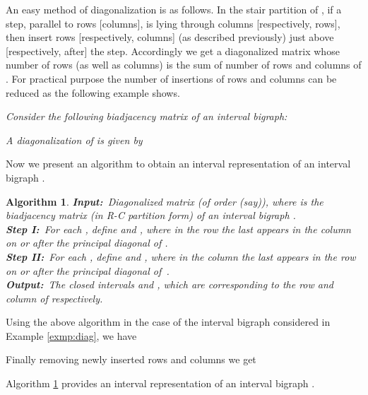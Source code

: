 \documentclass[secthm]{elsart}
\newtheorem{algo}[thm]{Algorithm}
\begin{document}
An easy method of diagonalization is as follows. In the stair partition of , if a step, parallel to rows [columns], is lying through  columns [respectively, rows], then insert  rows [respectively, columns] (as described previously) just above [respectively, after] the step. Accordingly we get a diagonalized matrix  whose number of rows (as well as columns) is the sum of number of rows and columns of . For practical purpose the number of insertions of rows and columns can be reduced as the following example shows.

\begin{exmp}\label{exmp:diag}
{\em Consider the following biadjacency matrix  of an interval bigraph:}

\vspace{-1.5em}

{\em A diagonalization of  is given by} 

\end{exmp}

\vspace{-1em}Now we present an algorithm to obtain an interval representation of an interval bigraph .

\begin{algo} \label{alg:big1}
{\em {\small\bf Input:}\ Diagonalized matrix  (of order  (say)), where  is the biadjacency matrix (in R-C partition form) of an interval bigraph .\\
{\small\bf Step I:}\ For each , define  and , where in the  row the last  appears in the  column on or after the principal diagonal of .\\
{\small\bf Step II:}\ For each , define  and , where in the  column the last  appears in the  row on or after the principal diagonal  \mbox{of }.\\
{\small\bf Output:}\ The closed intervals  and , which are corresponding to the  row and  column of  respectively.}
\end{algo}

Using the above algorithm in the case of the interval bigraph considered in Example \ref{exmp:diag}, we have

Finally removing newly inserted rows and columns we get


\begin{prop}
Algorithm \ref{alg:big1} provides an interval representation of an interval bigraph .
\end{prop} 
\end{document}
